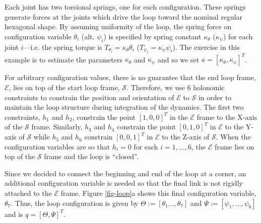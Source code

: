 \documentclass[letterpaper, 10pt, conference]{ieeeconf}
\begin{document}
Each joint has two torsional springs, one for each configuration.  These springs generate forces at the joints which drive the loop toward the nominal regular hexagonal shape.  By assuming uniformity of the loop, the spring force on configuration variable $\theta_i$ (alt. $\psi_i$) is specified by spring constant $\kappa_{\theta}$ ($\kappa_{\psi}$) for each joint $i$---i.e. the spring torque is $T_{\theta_i} = \kappa_{\theta}\theta_i$ ($T_{\psi_i} = \kappa_{\psi}\psi_i$).  The exercise in this example is to estimate the parameters $\kappa_{\theta}$ and $\kappa_{\psi}$ and so we set $a = [\kappa_{\theta},\kappa_{\psi}]^T$.  

For arbitrary configuration values, there is no guarantee that the end loop frame, $\mathcal{E}$, lies on top of the start loop frame, $\mathcal{S}$. Therefore, we use 6 holonomic constraints to constrain the position and orientation of $\mathcal{E}$ to $\mathcal{S}$ in order to maintain the loop structure during integration of the dynamics.  The first two constraints, $h_1$ and $h_2$, constrain the point $[1, 0, 0]^T$ in the $\mathcal{E}$ frame to the X-axis of the $\mathcal{S}$ frame. Similarly, $h_3$ and $h_4$ constrain the point $[0,1,0]^T$ in $\mathcal{E}$ to the Y-axis of $\mathcal{S}$ while $h_5$ and $h_6$ constrain $[0,0,1]^T$ in $\mathcal{E}$ to the Z-axis of $\mathcal{S}$.  When the configuration variables are so that $h_i = 0$ for each $i = 1,\ldots,6$, the $\mathcal{E}$ frame lies on top of the $\mathcal{S}$ frame and the loop is ``closed''. 

Since we decided to connect the beginning and end of the loop at a corner, an additional configuration variable is needed so that the final link is not rigidly attached to the $\mathcal{E}$ frame.  Figure \ref{fig-loop}a shows this final configuration variable, $\theta_7$.  Thus, the loop configuration is given by $\Theta:=[\theta_1\ldots,\theta_7]$ and $\Psi:=[\psi_1,\ldots,\psi_6]$ and is $q = [\Theta,\Psi]^T$.  
\end{document}
